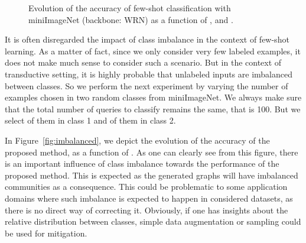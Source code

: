 \documentclass[a4paper,conference]{IEEEtran}
\begin{document}
\begin{figure}[h]
\begin{center}
  \end{center}
  \vspace{-.5cm}
  \caption{Evolution of the accuracy of few-shot classification with miniImageNet (backbone: WRN) as a function of ,  and .}
  \label{fig:functionofkappa}
\end{figure}

It is often disregarded the impact of class imbalance in the context of few-shot learning. As a matter of fact, since we only consider very few labeled examples, it does not make much sense to consider such a scenario. But in the context of transductive setting, it is highly probable that unlabeled inputs are imbalanced between classes. So we perform the next experiment by varying the number of examples chosen in two random classes from miniImageNet. We always make sure that the total number of queries to classify remains the same, that is 100. But we select  of them in class 1 and  of them in class 2.

In Figure~\ref{fig:imbalanced}, we depict the evolution of the accuracy of the proposed method, as a function of . As one can clearly see from this figure, there is an important influence of class imbalance towards the performance of the proposed method. This is expected as the generated graphs will have imbalanced communities as a consequence. This could be problematic to some application domains where such imbalance is expected to happen in considered datasets, as there is no direct way of correcting it. Obviously, if one has insights about the relative distribution between classes, simple data augmentation or sampling could be used for mitigation.
\end{document}
